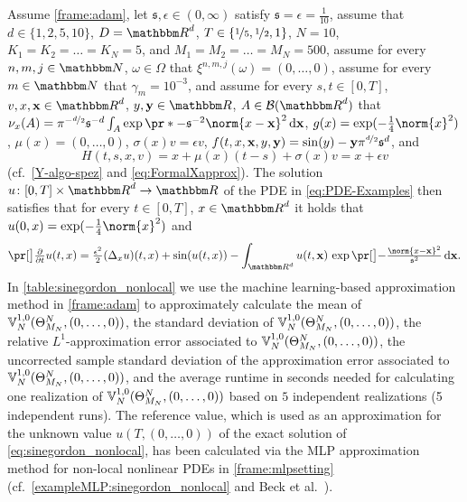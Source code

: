 Assume 
	\cref{frame:adam},
let
	$\mathfrak s,\epsilon\in(0,\infty)$
satisfy
	$\mathfrak{s} = \epsilon =\tfrac{1}{10}$,
assume that
	$d\in\{1,2,5,10\}$,
	$\D = \R^d$,
	$T\in\{\nicefrac{1}{5},\nicefrac{1}{2},1\}$,
	$N=10$,
	$K_1 = K_2 = \ldots = K_N= 5$, and
	$M_1 = M_2 = \ldots = M_N = 500$,
assume 
	for every 
		$n,m,j\in \N$, 
		$\omega \in \Omega$
	that 
		$\xi^{n,m,j}(\omega)=(0,\dots,0)$,
assume 
	for every 
		$m \in \N$
	that
		$\gamma_m = 10^{-3}$,
and assume 
	for every 
		$s,t \in [0,T]$, 
		$v,x,\mathbf{x}%
		\in \R^d$, 
		$y,\mathbf{y} \in \R$,
		$A \in \mathcal{B}(\R^d)$
	that
		$\nu_x(A) = \pi^{-\nicefrac{d}{2}}\mathfrak{s}^{-d}\int_A \exp\pr*{-\mathfrak{s}^{-2}\norm{x - \mathbf{x}}^2}\,\diff\mathbf{x}$,
		$g(x)= \exp (-\tfrac{1}{4}\norm{x}^2)$,
		$\mu(x)=(0,\dots,0)$,
		$\sigma(x) v = \epsilon v$, 
		$f(t,x,\mathbf{x},y,\mathbf{y}%
		)=  \sin(y) - \mathbf{y} \pi^{\nicefrac{d}{2}}\mathfrak{s}^d$, 
		and
	\begin{equation}
		\label{eq:Hsinegordon}
		H(t,s,x,v)
		=
		x + \mu(x)(t-s)+ \sigma(x)v
		=
		x+\epsilon v
	\end{equation}
	(cf.\ \eqref{Y-algo-spez} and \eqref{eq:FormalXapprox}).
The solution 
	$u\colon[0,T]\times \R^d \to \R$ 
	of the PDE in \eqref{eq:PDE-Examples} then satisfies that 
		for every
			$t\in [0,T]$, 
			$x\in\R^d$ 
		it holds that 
			$u(0,x)=\exp (-\tfrac{1}{4}\norm{x}^2)$ and
		\begin{equation}
			\label{eq:sinegordon_nonlocal}
			\bpr{\tfrac{\partial}{\partial t}u}(t,x)
			=
			\tfrac{\epsilon^2}{2}(\Delta_x u)(t,x) + \sin ( u(t,x) ) - \int_{\R^d} u(t,\mathbf{x})\, \exp\bpr{-\tfrac{\norm{x-\mathbf{x}}^2}{\mathfrak{s}^2}}\,\diff\mathbf{x} 
			.
		\end{equation}
%
%
In \cref{table:sinegordon_nonlocal} 
we use the machine learning-based approximation method
in \cref{frame:adam} 
to approximately calculate
the mean of %
$
{\mathbb{V}}^{1,0}_N(\Theta^N_{M_N},\allowbreak (0,\ldots,0))
$,
the standard deviation of %
$
{\mathbb{V}}^{1,0}_N(\Theta^N_{M_N},\allowbreak (0,\ldots,0))
$,
the relative $ L^1 $-approximation error associated to %
$
{\mathbb{V}}^{1,0}_N(\Theta^N_{M_N},\allowbreak (0,\ldots,\allowbreak 0))
$,
the uncorrected sample standard deviation of the approximation error associated to %
$
{\mathbb{V}}^{1,0}_N(\Theta^N_{M_N},\allowbreak (0,\ldots,0))
$,
and the average runtime in seconds needed for calculating one realization of $
{\mathbb{V}}^{1,0}_N(\Theta^N_{M_N},\allowbreak (0,\ldots,0))
$
%
based on $5$ independent realizations (5 independent runs).
%
The reference value, which is used as an approximation for the unknown value $u(T,(0,\ldots,0))$ of the exact solution of \eqref{eq:sinegordon_nonlocal},  has been calculated via the MLP approximation method for non-local nonlinear PDEs in \cref{frame:mlpsetting} (cf.~\cref{exampleMLP:sinegordon_nonlocal} and Beck et al.~\citep[Remark~3.3]{Beck2017a}).

